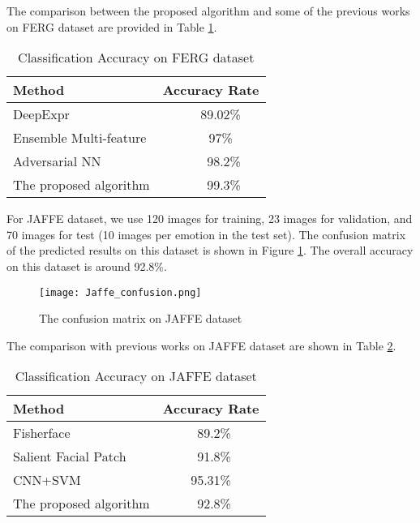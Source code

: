 \documentclass[conference]{IEEEtran}
\begin{document}
The comparison between the proposed algorithm and some of the previous works on FERG dataset are provided in Table \ref{table:FERG}.
\begin{table}[h]
\centering
  \caption{Classification Accuracy on FERG dataset}
\begin{tabular}{|m{5cm}|c|}
\hline
Method  & Accuracy Rate\\
\hline
DeepExpr \cite{aneja2016modeling} & \ \ \ 89.02\% \\
\hline 
Ensemble Multi-feature \cite{ensemble} & \ \ \ 97\% \\
\hline 
Adversarial NN \cite{Ad-NN} &   \ \ \ \ 98.2\% \\
\hline
 The proposed algorithm  &  \ \ \ \ 99.3\%\\
\hline
\end{tabular}
\label{table:FERG}
\end{table}

\iffalse
The accuracy of the model (on validation set) over different epochs on FERG is provided in Figure \ref{fig:AccFER}. 
As it can be seen, after the 200th epoch, there are not much improvement in the model performance.
\begin{figure}[h]
\begin{center}
   \texttt{[image: ferg.png]}
\end{center}
   \caption{FERG validation accuracies over different epochs}
\label{fig:AccFER}
\end{figure}
\fi


For JAFFE dataset, we use 120 images for training, 23 images for validation, and 70 images for test (10 images per emotion in the test set). 
The confusion matrix of the predicted results on this dataset is shown in Figure \ref{fig:ConfusionJAFFE}. The overall accuracy on this dataset is around 92.8\%.
\begin{figure}[t]
\begin{center}
   \texttt{[image: Jaffe\_confusion.png]}
\end{center}
   \caption{The confusion matrix on JAFFE dataset}
\label{fig:ConfusionJAFFE}
\end{figure}

The comparison with previous works on JAFFE dataset are shown in Table \ref{table:JAFFE}.
\begin{table}[h]
\centering
  \caption{Classification Accuracy on JAFFE dataset}
\begin{tabular}{| m{5cm} | c |}
\hline
Method  & Accuracy Rate\\
\hline
Fisherface \cite{fisherface}  &  \ 89.2\%\\
\hline 
Salient Facial Patch \cite{SFP} &   \  91.8\% \\
\hline
CNN+SVM \cite{shima2018image} & 95.31\% \\
\hline
The proposed algorithm  &  \ 92.8\%\\
\hline
\end{tabular}
\label{table:JAFFE}
\end{table}
\end{document}
